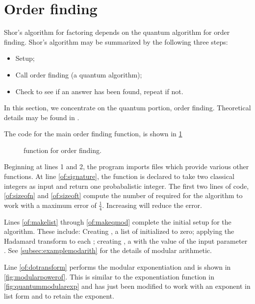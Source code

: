 \section{Order finding}\label{sec:orderfinding}
Shor's algorithm for factoring depends on the quantum algorithm for 
order finding. Shor's algorithm may be summarized
by the following three steps:
\begin{itemize}
\item{}Setup;
\item{}Call order finding (a quantum algorithm);
\item{}Check to see if an answer has been found, repeat if not.
\end{itemize}

In this section, we concentrate on the quantum portion, order finding. 
Theoretical details may be found in \cite{neilsen2000:QuantumComputationAndInfo}.

The code for the main order finding function,  
is shown in \ref{fig:orderfind}

\begin{figure}[htbp]

\caption{\lqpl{} function for order finding.}\label{fig:orderfind}
\end{figure}

Beginning at lines 1 and 2, the program imports files which
provide various other functions. At line \ref{of:signature}, the 
function is declared to take two classical integers as input and return
one probabalistic integer. The first two lines of code, \ref{of:sizeofn} and
\ref{of:sizeoft} compute the number of \qubits{} required for the algorithm
to work with a maximum error of $\frac{1}{4}$. Increasing 
 will reduce the error.

Lines \ref{of:makelist} through \ref{of:makeqmod} complete the initial setup
for the algorithm. These include: Creating , 
a list of  \qubits{} initialized to zero; applying the Hadamard 
transform to each \qubit; creating , a  with 
the value of the input parameter . See \vref{subsec:examplemodarith}
for the details of modular arithmetic.

Line \ref{of:dotransform} performs the modular exponentiation and is shown in
\ref{fig:modularpowerof}. This is similar to the exponentiation function in 
\vref{fig:quantummodularexp} and has just been modified to work with an 
exponent in list form and to retain the exponent.

